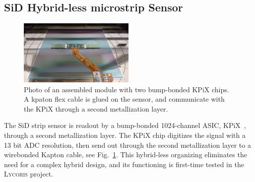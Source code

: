 \documentclass[journal]{IEEEtran}
\def\lycoris{\textsc{Lycoris}\xspace}%
\begin{document}

\subsection{SiD Hybrid-less microstrip Sensor}

\begin{figure}[!t]
\centering
\includegraphics[width=2.2in]{pics/sensor_module1.jpg}
\caption{Photo of an assembled module with two bump-bonded KPiX chips.
A kpaton flex cable is glued on the sensor,
and communicate with the KPiX through a second metallization layer.}
\label{fig:sensor}
\end{figure}

The SiD strip sensor is readout by a bump-bonded 1024-channel ASIC, KPiX~\cite{kpix}, through a second metallization layer.
The KPiX chip digitizes the signal with a 13 bit ADC resolution, then send out through the second metallization layer to a wirebonded Kapton cable, see Fig.~\ref{fig:sensor}.
This hybrid-less organizing eliminates the need for a complex hybrid design, and its functioning is first-time tested in the \lycoris project.
\end{document}
